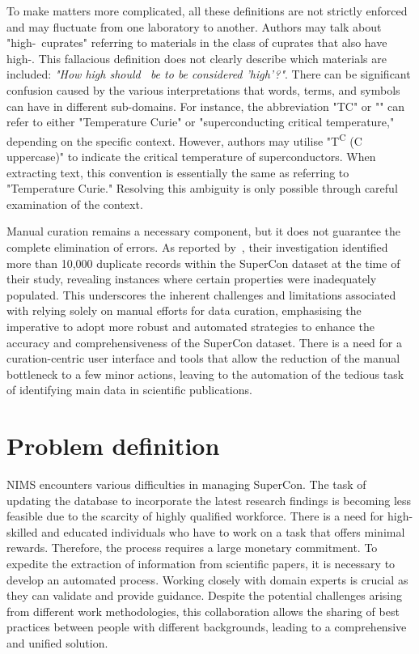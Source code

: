 To make matters more complicated, all these definitions are not strictly enforced and may fluctuate from one laboratory to another. 
Authors may talk about "high-\tc~cuprates" referring to materials in the class of cuprates that also have high-\tc. This fallacious definition does not clearly describe which materials are included: \textit{"How high should \tc~be to be considered 'high'?"}.
There can be significant confusion caused by the various interpretations that words, terms, and symbols can have in different sub-domains. For instance, the abbreviation "TC" or "\tc" can refer to either "Temperature Curie" or "superconducting critical temperature," depending on the specific context. However, authors may utilise "T\textsuperscript{C} (C uppercase)" to indicate the critical temperature of superconductors. When extracting text, this convention is essentially the same as referring to "Temperature Curie." Resolving this ambiguity is only possible through careful examination of the context.

Manual curation remains a necessary component, but it does not guarantee the complete elimination of errors. As reported by~\cite{sommer20223dsc}, their investigation identified more than 10,000 duplicate records within the SuperCon dataset at the time of their study, revealing instances where certain properties were inadequately populated. 
This underscores the inherent challenges and limitations associated with relying solely on manual efforts for data curation, emphasising the imperative to adopt more robust and automated strategies to enhance the accuracy and comprehensiveness of the SuperCon dataset.
There is a need for a curation-centric user interface and tools that allow the reduction of the manual bottleneck to a few minor actions, leaving to the automation of the tedious task of identifying main data in scientific publications.


\section{Problem definition}

NIMS encounters various difficulties in managing SuperCon. The task of updating the database to incorporate the latest research findings is becoming less feasible due to the scarcity of highly qualified workforce. 
There is a need for high-skilled and educated individuals who have to work on a task that offers minimal rewards. Therefore, the process requires a large monetary commitment.
To expedite the extraction of information from scientific papers, it is necessary to develop an automated process. Working closely with domain experts is crucial as they can validate and provide guidance. 
Despite the potential challenges arising from different work methodologies, this collaboration allows the sharing of best practices between people with different backgrounds, leading to a comprehensive and unified solution.

